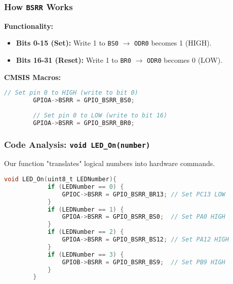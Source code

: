 \documentclass{beamer}
\begin{document}
\begin{frame}[fragile]
	\frametitle{How \texttt{BSRR} Works}
	\textbf{Functionality:}
	\begin{itemize}
		\item \textbf{Bits 0-15 (Set):} Write 1 to \texttt{BS0} $\rightarrow$ \texttt{ODR0} becomes 1 (HIGH).
		\item \textbf{Bits 16-31 (Reset):} Write 1 to \texttt{BR0} $\rightarrow$ \texttt{ODR0} becomes 0 (LOW).
	\end{itemize}
	
	\bigskip
	\textbf{CMSIS Macros:}
	\begin{lstlisting}[language=C, style=mystyle]
		// Set pin 0 to HIGH (write to bit 0)
		GPIOA->BSRR = GPIO_BSRR_BS0;
		
		// Set pin 0 to LOW (write to bit 16)
		GPIOA->BSRR = GPIO_BSRR_BR0;
	\end{lstlisting}
\end{frame}

\begin{frame}[fragile]
	\frametitle{Code Analysis: \texttt{void LED\_On(number)}}
	Our function "translates" logical numbers into hardware commands.
	
	\begin{lstlisting}[language=C, style=mystyle, basicstyle=\scriptsize]
		void LED_On(uint8_t LEDNumber){
			if (LEDNumber == 0) {
				GPIOC->BSRR = GPIO_BSRR_BR13; // Set PC13 LOW
			}
			if (LEDNumber == 1) {
				GPIOA->BSRR = GPIO_BSRR_BS0;  // Set PA0 HIGH
			}
			if (LEDNumber == 2) {
				GPIOA->BSRR = GPIO_BSRR_BS12; // Set PA12 HIGH
			}
			if (LEDNumber == 3) {
				GPIOB->BSRR = GPIO_BSRR_BS9;  // Set PB9 HIGH
			}
		}
	\end{lstlisting}
\end{frame}
\end{document}
